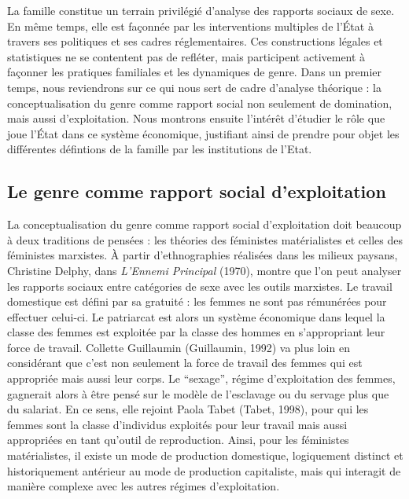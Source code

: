 \documentclass[
  12pt,
]{book}
\begin{document}
La famille constitue un terrain privilégié d'analyse des rapports
sociaux de sexe. En même temps, elle est façonnée par les interventions
multiples de l'État à travers ses politiques et ses cadres
réglementaires. Ces constructions légales et statistiques ne se
contentent pas de refléter, mais participent activement à façonner les
pratiques familiales et les dynamiques de genre. Dans un premier temps,
nous reviendrons sur ce qui nous sert de cadre d'analyse théorique : la
conceptualisation du genre comme rapport social non seulement de
domination, mais aussi d'exploitation. Nous montrons ensuite l'intérêt
d'étudier le rôle que joue l'État dans ce système économique, justifiant
ainsi de prendre pour objet les différentes défintions de la famille par
les institutions de l'Etat.

\subsection{Le genre comme rapport social
d'exploitation}\label{le-genre-comme-rapport-social-dexploitation}

La conceptualisation du genre comme rapport social d'exploitation doit
beaucoup à deux traditions de pensées : les théories des féministes
matérialistes et celles des féministes marxistes. À partir
d'ethnographies réalisées dans les milieux paysans, Christine Delphy,
dans \emph{L'Ennemi Principal} (1970), montre que l'on peut analyser les
rapports sociaux entre catégories de sexe avec les outils marxistes. Le
travail domestique est défini par sa gratuité : les femmes ne sont pas
rémunérées pour effectuer celui-ci. Le patriarcat est alors un système
économique dans lequel la classe des femmes est exploitée par la classe
des hommes en s'appropriant leur force de travail. Collette Guillaumin
(Guillaumin, 1992) va plus loin en considérant que c'est non seulement
la force de travail des femmes qui est appropriée mais aussi leur corps.
Le ``sexage'', régime d'exploitation des femmes, gagnerait alors à être
pensé sur le modèle de l'esclavage ou du servage plus que du salariat.
En ce sens, elle rejoint Paola Tabet (Tabet, 1998), pour qui les femmes
sont la classe d'individus exploités pour leur travail mais aussi
appropriées en tant qu'outil de reproduction. Ainsi, pour les féministes
matérialistes, il existe un mode de production domestique, logiquement
distinct et historiquement antérieur au mode de production capitaliste,
mais qui interagit de manière complexe avec les autres régimes
d'exploitation.
\end{document}

